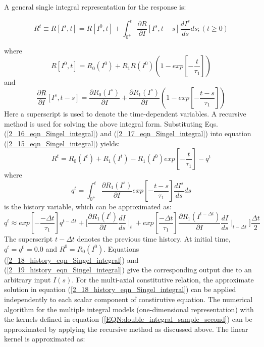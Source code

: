 A general single integral representation for the response is: 

\begin{equation}
R^t \equiv R[I^s,t]=R[I^0,t]+\int_{0^+}^{t} \frac{\partial R}{\partial I}[I^s,t-s] \frac{d I^s}{d s} ds 
; (t \geq 0)
\label{2_15_eqn_Singel_integral}
\end{equation}

where
\begin{equation}
R[I^0,t]=R_0(I^0)+R_1 R(I^0) \left(1-exp \left[-\frac{t}{\tau_1} \right] \right)
\label{2_16_eqn_Singel_integral}
\end{equation}
and
\begin{equation}
\frac{\partial R}{\partial I}[I^s,t-s]=\frac{\partial R_0(I^s)}{\partial I}+\frac{\partial R_1(I^s)}{\partial I}
\left(1-exp \left[-\frac{t-s}{\tau_1} \right] \right)
\label{2_17_eqn_Singel_integral}
\end{equation}
Here a superscript is used to denote the time-dependent variables. 
A recursive method is used for solving the above integral form. 
Substituting Eqs. (\ref{2_16_eqn_Singel_integral}) and (\ref{2_17_eqn_Singel_integral}) into equation (\ref{2_15_eqn_Singel_integral}) yields:
\begin{equation}
R^t=R_0(I^t)+R_1(I^t)-R_1(I^0) exp \left[-\frac{t}{\tau_1} \right]-q^t
\label{2_18_history_eqn_Singel_integral}
\end{equation}
where
\begin{equation}
q^t=\int_{0^+}^{t} \frac{\partial R_1 (I^s) }{\partial I} exp \left[-\frac{t-s}{\tau_1} \right] \frac{d I^s}{d s} ds
\label{2_19_history_eqn_Singel_integral}
\end{equation}
is the history variable, which can be approximated as: 
\begin{equation}
q^t \approx  exp \left[-\frac{-\Delta t}{\tau_1} \right] q^{t-\Delta t}+ 
\Big[\frac{\partial R_1 (I^t) } {\partial I} \frac{d I}{d s} \mid_t
+exp \left[ \frac{-\Delta t}{\tau_1} \right]  
\frac{\partial R_1 (I^{t-\Delta t}) } {\partial I} \frac{d I}{d s} \mid_{t-\Delta t} \Big] \frac{\Delta t}{2}
\label{2_20_EQN:single_integral_history_variables}
\end{equation}
The superscript $t-\Delta t$ denotes the previous time history. 
At initial time, $q^t=q^0=0.0$ and $R^0=R_0(I^0)$. Equations (\ref{2_18_history_eqn_Singel_integral}) and (\ref{2_19_history_eqn_Singel_integral}) give the corresponding output due to an arbitrary input $I(s)$.
For the multi-axial constitutive relation, the approximate solution in equation (\ref{2_18_history_eqn_Singel_integral}) can be applied independently to each scalar component of constirutive equation.
The numerical algorithm for the multiple integral models (one-dimensional representation) with the kernels defined in equation (\ref{EQN:double_integral_sample_second}) can be approximated by applying the recursive method as discussed above. 
The linear kernel is approximated as:

